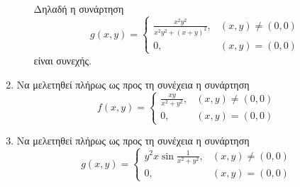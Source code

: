 \begin{examples}
\begin{enumerate}
\begin{enumerate}[i)]
\begin{solution}
                        Δηλαδή η συνάρτηση 
                        \[
                            g(x,y) = \begin{cases} \frac{x^{2}y^{2}}{x^{2}y^{2} + (x+y)^{2}}, & (x,y) \neq
                                (0,0) \\ 
                            0, & (x,y) = (0,0)\end{cases}  
                        \] είναι συνεχής.
                            \end{solution}
                    \end{enumerate}
                \item Να μελετηθεί πλήρως ως προς τη συνέχεια η συνάρτηση 
                    \[
                        f(x,y) = \begin{cases} \frac{xy}{x^{2}+y^{2}}, & (x,y) \neq (0,0) \\ 0, & (x,y) =
                        (0,0) \end{cases}  
                    \]

                \item Να μελετηθεί πλήρως ως προς τη συνέχεια η συνάρτηση 
                    \[
                        g(x,y) = \begin{cases} y^{2}x \sin{\frac{1}{x^{2}+y^{2}}}, & (x,y) \neq (0,0) \\ 0, & (x,y)
                        = (0,0)\end{cases}  
                    \] 
\end{enumerate}
\end{examples}
